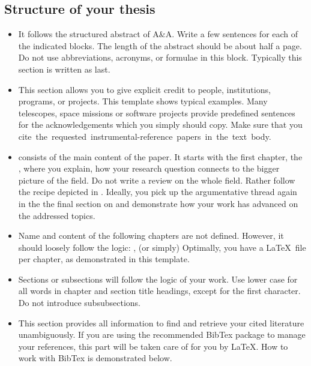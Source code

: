 \subsection*{Structure of your thesis}
\begin{itemize}
    \item {} It follows the structured abstract of A\&A. Write a few sentences for each of the indicated blocks. The length of the abstract should be about half a page. Do not use abbreviations, acronyms, or formulae in this block.  Typically this section is written as last.

    \item {} This section allows you to give explicit credit to people, institutions, programs, or projects. This template shows typical examples. Many telescopes, space missions or software projects provide predefined sentences for the acknowledgements which you simply should copy. Make sure that you \hbox{cite the requested instrumental-reference papers in the text body.}
    
    \item {} consists of the main content of the paper. It starts with the first chapter, the , where you explain, how your research question connects to the bigger picture  of the field. Do not write a review on the whole field. Rather follow the recipe depicted in . Ideally, you pick up the argumentative thread again in the the final section on  and demonstrate how your work has advanced on the addressed topics.
    
    \item  Name and content of the following chapters are not defined. However, it should loosely follow the logic: ,  (or simply)  Optimally, you have a \LaTeX\  file per chapter, as demonstrated in this template.
    
    \item Sections or subsections will follow the logic of your work. Use lower case for all words in chapter and section title headings, except for the first character. Do not introduce subsubsections.
    

    
    \item {} This section provides all information to find and retrieve your cited literature unambiguously. If you are using the recommended BibTex package to manage your references, this part will be taken care of for you by \LaTeX. How to work with BibTex is demonstrated below.
    

\end{itemize}
